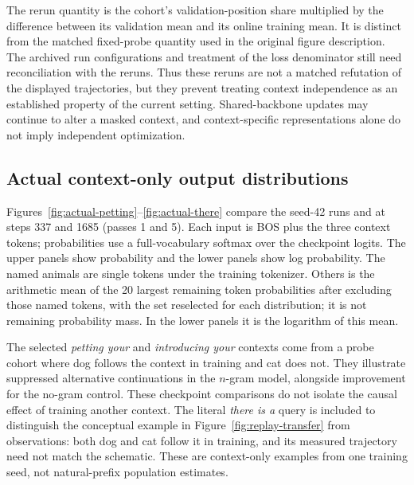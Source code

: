 The rerun quantity is the cohort's validation-position share multiplied by the difference between its validation mean and its online training mean. It is distinct from the matched fixed-probe quantity used in the original figure description. The archived run configurations and treatment of the loss denominator still need reconciliation with the reruns. Thus these reruns are not a matched refutation of the displayed trajectories, but they prevent treating context independence as an established property of the current setting. Shared-backbone updates may continue to alter a masked context, and context-specific representations alone do not imply independent optimization.



\subsection{Actual context-only output distributions}
\label{app:actual-logits}

Figures~\ref{fig:actual-petting}--\ref{fig:actual-there} compare the seed-42 runs  and  at steps 337 and 1685 (passes 1 and 5). Each input is BOS plus the three context tokens; probabilities use a full-vocabulary softmax over the checkpoint logits. The upper panels show probability and the lower panels show log probability. The named animals are single tokens under the training tokenizer. Others is the arithmetic mean of the 20 largest remaining token probabilities after excluding those named tokens, with the set reselected for each distribution; it is not remaining probability mass. In the lower panels it is the logarithm of this mean.

The selected \emph{petting your} and \emph{introducing your} contexts come from a probe cohort where dog follows the context in training and cat does not. They illustrate suppressed alternative continuations in the $n$-gram model, alongside improvement for the no-gram control. These checkpoint comparisons do not isolate the causal effect of training another context. The literal \emph{there is a} query is included to distinguish the conceptual example in Figure~\ref{fig:replay-transfer} from observations: both dog and cat follow it in training, and its measured trajectory need not match the schematic. These are context-only examples from one training seed, not natural-prefix population estimates.

